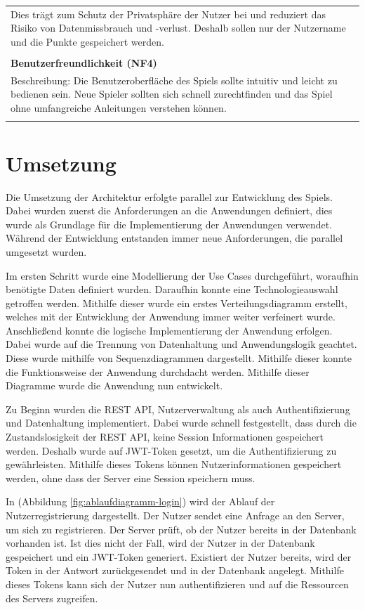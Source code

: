 \documentclass[
]{article}
\begin{document}
\begin{center}
\begin{tabular}{|p{\linewidth + 20pt}|}
     Dies trägt zum Schutz der Privatsphäre der Nutzer bei und reduziert das Risiko von Datenmissbrauch und -verlust.
     Deshalb sollen nur der Nutzername und die Punkte gespeichert werden.
    \\ \\
    \hline
    \textbf{Benutzerfreundlichkeit (NF4)} \\
    Beschreibung: Die Benutzeroberfläche des Spiels sollte intuitiv und leicht zu bedienen sein. Neue Spieler sollten sich schnell zurechtfinden und das Spiel ohne umfangreiche Anleitungen verstehen können.\\ \\
    \hline
  \end{tabular}
\end{center}

\newpage
\section{Umsetzung}
Die Umsetzung der Architektur erfolgte parallel zur Entwicklung des Spiels.
Dabei wurden zuerst die Anforderungen an die Anwendungen definiert, dies wurde als Grundlage
für die Implementierung der Anwendungen verwendet. Während der Entwicklung entstanden immer
neue Anforderungen, die parallel umgesetzt wurden.

Im ersten Schritt wurde eine Modellierung der Use Cases durchgeführt, woraufhin benötigte Daten definiert wurden.
Daraufhin konnte eine Technologieauswahl getroffen werden. Mithilfe dieser wurde ein erstes Verteilungsdiagramm erstellt,
welches mit der Entwicklung der Anwendung immer weiter verfeinert wurde. Anschließend konnte die logische Implementierung
der Anwendung erfolgen. Dabei wurde auf die Trennung von Datenhaltung und Anwendungslogik geachtet.
Diese wurde mithilfe von Sequenzdiagrammen dargestellt. Mithilfe dieser konnte die Funktionsweise der Anwendung
durchdacht werden. Mithilfe dieser Diagramme wurde die Anwendung nun entwickelt.

Zu Beginn wurden die REST API, Nutzerverwaltung als auch Authentifizierung und Datenhaltung implementiert.
Dabei wurde schnell festgestellt, dass durch die Zustandslosigkeit der REST API,
keine Session Informationen gespeichert werden. Deshalb wurde auf JWT-Token gesetzt, um die Authentifizierung
zu gewährleisten. Mithilfe dieses Tokens können Nutzerinformationen gespeichert werden, ohne dass der Server
eine Session speichern muss. 

In (Abbildung \ref{fig:ablaufdiagramm-login}) wird der Ablauf der Nutzerregistrierung dargestellt.
Der Nutzer sendet eine Anfrage an den Server, um sich zu registrieren. Der Server prüft, ob der Nutzer bereits
in der Datenbank vorhanden ist. Ist dies nicht der Fall, wird der Nutzer in der Datenbank gespeichert und ein JWT-Token generiert.
Existiert der Nutzer bereits, wird der Token in der Antwort zurückgesendet und in der Datenbank angelegt.
Mithilfe dieses Tokens kann sich der Nutzer nun authentifizieren und auf die Ressourcen des Servers zugreifen.
\end{document}
